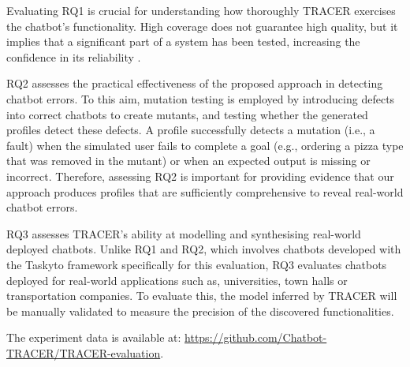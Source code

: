 Evaluating RQ1 is crucial for understanding
how thoroughly \ac{TRACER} exercises the chatbot’s functionality.
High coverage does not guarantee high quality,
but it implies that a significant part of a system has been tested,
increasing the confidence in its reliability
\autocite{ammannIntroductionSoftwareTesting2017}.


RQ2 assesses the practical effectiveness
of the proposed approach in detecting chatbot errors.
To this aim, mutation testing is employed
\autocite{demilloHintsTestData1978}
by introducing defects into correct chatbots to create mutants,
and testing whether the generated profiles detect these defects.
A profile successfully detects a mutation (i.e., a fault)
when the simulated user fails to complete a goal
(e.g., ordering a pizza type that was removed in the mutant)
or when an expected output is missing or incorrect.
Therefore, assessing RQ2 is important
for providing evidence that our approach produces
profiles that are sufficiently comprehensive
to reveal real-world chatbot errors.

RQ3 assesses \ac{TRACER}'s ability at modelling and synthesising
real-world deployed chatbots.
Unlike RQ1 and RQ2, which involves chatbots developed with the Taskyto framework
specifically for this evaluation,
RQ3 evaluates chatbots deployed for real-world applications
such as, universities, town halls or transportation companies.
To evaluate this, the model inferred by \ac{TRACER}
will be manually validated to measure the precision
of the discovered functionalities.

The experiment data is available at:
\url{https://github.com/Chatbot-TRACER/TRACER-evaluation}.






